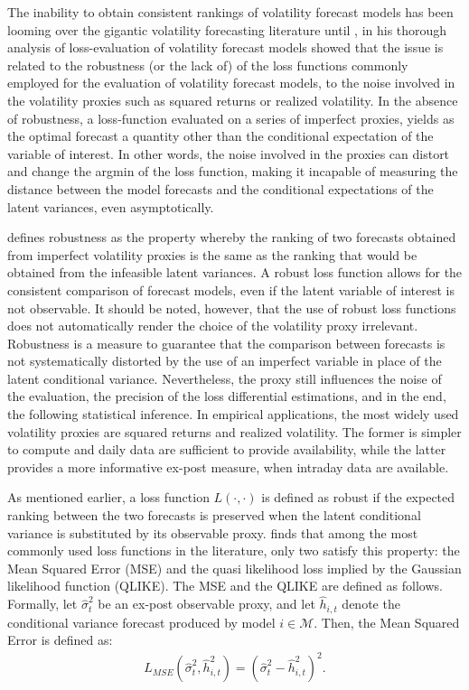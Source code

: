\documentclass{article} %
\begin{document}
	The inability to obtain consistent rankings of volatility forecast models has been looming over the gigantic volatility forecasting literature until \textcite{PATTON2011246}, in his thorough analysis of loss-evaluation of volatility forecast models showed that the issue is related to the robustness (or the lack of) of the loss functions commonly employed for the evaluation of volatility forecast models, to the noise involved in the volatility proxies such as squared returns or realized volatility. In the absence of robustness, a loss-function evaluated on a series of imperfect proxies, yields as the optimal forecast a quantity other than the conditional expectation of the variable of interest. In other words, the noise involved in the proxies can distort and change the argmin of the loss function, making it incapable of measuring the distance between the model forecasts and the conditional expectations of the latent variances, even asymptotically.
	
	\textcite{PATTON2011246} defines robustness as the property whereby the ranking of two forecasts obtained from imperfect volatility proxies is the same as the ranking that would be obtained from the infeasible latent variances. A robust loss function allows for the consistent comparison of forecast models, even if the latent variable of interest is not observable. It should be noted, however, that the use of robust loss functions does not automatically render the choice of the volatility proxy irrelevant. Robustness is a measure to guarantee that the comparison between forecasts is not systematically distorted by the use of an imperfect variable in place of the latent conditional variance. Nevertheless, the proxy still influences the noise of the evaluation, the precision of the loss differential estimations, and in the end, the following statistical inference. In empirical applications, the most widely used volatility proxies are squared returns and realized volatility. The former is simpler to compute and daily data are sufficient to provide availability, while the latter provides a more informative ex-post measure, when intraday data are available.
	
	As mentioned earlier, a loss function $L(\cdot, \cdot)$ is defined as robust if the expected ranking between the two forecasts is preserved when the latent conditional variance is substituted by its observable proxy. \textcite{PATTON2011246} finds that among the most commonly used loss functions in the literature, only two satisfy this property: the Mean Squared Error (MSE) and the quasi likelihood loss implied by the Gaussian likelihood function (QLIKE). The MSE and the QLIKE are defined as follows. Formally, let $\hat{\sigma}_t^2$ be an ex-post observable proxy, and let $\hat{h}_{i,t}$ denote the conditional variance forecast produced by model $i \in \mathcal{M}$. Then, the Mean Squared Error is defined as: 
	\begin{align}
	L_{MSE}(\hat{\sigma}_t^2,\hat{h}_{i,t}^2)
	=
	(\hat{\sigma}_t^2-\hat{h}_{i,t}^2)^2.
	\end{align}
	
\end{document}
